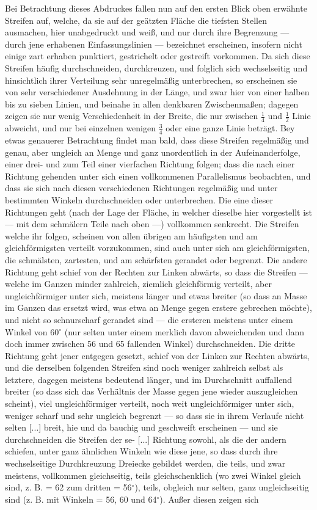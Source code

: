 \documentclass[a4paper, 11pt, oneside, german]{article}
\begin{document}
Bei Betrachtung dieses Abdruckes fallen nun auf den ersten Blick oben erwähnte Streifen auf, welche, da sie auf der geätzten Fläche die tiefsten Stellen ausmachen, hier unabgedruckt und weiß, und nur durch ihre Begrenzung --- durch jene erhabenen Einfassungslinien --- bezeichnet erscheinen, insofern nicht einige zart erhaben punktiert, gestrichelt oder gestreift vorkommen. Da sich diese Streifen häufig durchschneiden, durchkreuzen, und folglich sich wechselseitig und hinsichtlich ihrer Verteilung sehr unregelmäßig unterbrechen, so erscheinen sie von sehr verschiedener Ausdehnung in der Länge, und zwar hier von einer halben bis zu sieben Linien, und beinahe in allen denkbaren Zwischenmaßen; dagegen zeigen sie nur wenig Verschiedenheit in der Breite, die nur zwischen $\frac{1}{4}$ und $\frac{1}{2}$ Linie abweicht, und nur bei einzelnen wenigen $\frac{3}{4}$ oder eine ganze Linie beträgt. Bey etwas genauerer Betrachtung findet man bald, dass diese Streifen regelmäßig und genau, aber ungleich an Menge und ganz unordentlich in der Aufeinanderfolge, einer drei- und zum Teil einer vierfachen Richtung folgen; dass die nach einer Richtung gehenden unter sich einen vollkommenen Parallelismus beobachten, und dass sie sich nach diesen verschiedenen Richtungen regelmäßig und unter bestimmten Winkeln durchschneiden oder unterbrechen. Die eine dieser Richtungen geht (nach der Lage der Fläche, in welcher dieselbe hier vorgestellt ist --- mit dem schmälern Teile nach oben ---) vollkommen senkrecht. Die Streifen welche ihr folgen, scheinen von allen übrigen am häufigsten und am gleichförmigsten verteilt vorzukommen, sind auch unter sich am gleichförmigsten, die schmälsten, zartesten, und am schärfsten gerandet oder begrenzt. Die andere Richtung geht schief von der Rechten zur Linken abwärts, so dass die Streifen --- welche im Ganzen minder zahlreich, ziemlich gleichförmig verteilt, aber ungleichförmiger unter sich, meistens länger und etwas breiter (so dass an Masse im Ganzen das ersetzt wird, was etwa an Menge gegen erstere gebrechen möchte), und nicht so schnurscharf gerandet sind --- die ersteren meistens unter einem Winkel von 60$^{\circ}$ (nur selten unter einem merklich davon abweichenden und dann doch immer zwischen 56 und 65 fallenden Winkel) durchschneiden. Die dritte Richtung geht jener entgegen gesetzt, schief von der Linken zur Rechten abwärts, und die derselben folgenden Streifen sind noch weniger zahlreich selbst als letztere, dagegen meistens bedeutend länger, und im Durchschnitt auffallend breiter (so dass sich das Verhältnis der Masse gegen jene wieder auszugleichen scheint), viel ungleichförmiger verteilt, noch weit ungleichförmiger unter sich, weniger scharf und sehr ungleich begrenzt --- so dass sie in ihrem Verlaufe nicht selten [...] breit, hie und da bauchig und geschweift erscheinen --- und sie durchschneiden die Streifen der se- [...] Richtung sowohl, als die der andern schiefen, unter ganz ähnlichen Winkeln wie diese jene, so dass durch ihre wechselseitige Durchkreuzung Dreiecke gebildet werden, die teils, und zwar meistens, vollkommen gleichseitig, teils gleichschenklich (wo zwei Winkel gleich sind, z. B. = 62 zum dritten = 56$^{\circ}$), teils, obgleich nur selten, ganz ungleichseitig sind (z. B. mit Winkeln = 56, 60 und 64$^{\circ}$). Außer diesen zeigen sich 
\end{document}
